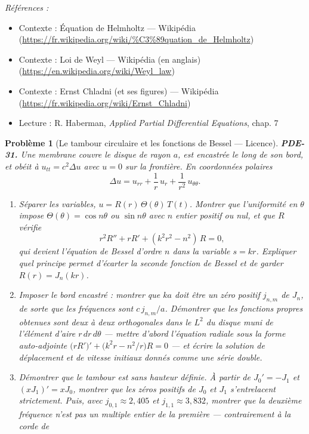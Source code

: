 \documentclass[11pt]{article}
\newtheorem{problem}{Problème}
\newenvironment{refs}{\par\small\noindent\emph{Références :}\begin{itemize}\setlength\itemsep{0pt}}{\end{itemize}\normalsize}
\begin{document}
\begin{refs}
\item Contexte : Équation de Helmholtz --- Wikipédia (\url{https://fr.wikipedia.org/wiki/%C3%89quation_de_Helmholtz})
\item Contexte : Loi de Weyl --- Wikipédia (en anglais) (\url{https://en.wikipedia.org/wiki/Weyl_law})
\item Contexte : Ernst Chladni (et ses figures) --- Wikipédia (\url{https://fr.wikipedia.org/wiki/Ernst_Chladni})
\item Lecture : R. Haberman, \textit{Applied Partial Differential Equations}, chap. 7
\end{refs}

\bigskip

\begin{problem}[{Le tambour circulaire et les fonctions de Bessel --- Licence}]
\textbf{PDE-31.} Une membrane couvre le disque de rayon $a$, est encastrée le long de son
bord, et obéit à $u_{tt} = c^2 \Delta u$ avec $u = 0$ sur la frontière. En coordonnées
polaires
\[ \Delta u = u_{rr} + \frac{1}{r}\,u_r + \frac{1}{r^2}\,u_{\theta\theta}. \]
\begin{enumerate}
\item[(a)] Séparer les variables, $u = R(r)\,\Theta(\theta)\,T(t)$. Montrer que l'uniformité en
$\theta$ impose $\Theta(\theta) = \cos n\theta$ ou $\sin n\theta$ avec $n$ entier
positif ou nul, et que $R$ vérifie
\[ r^2 R'' + r R' + (k^2 r^2 - n^2)\,R = 0, \]
qui devient l'équation de Bessel d'ordre $n$ dans la variable $s = kr$. Expliquer quel
principe permet d'écarter la seconde fonction de Bessel et de garder $R(r) = J_n(kr)$.
\item[(b)] Imposer le bord encastré : montrer que $k a$ doit être un zéro positif $j_{n,m}$ de
$J_n$, de sorte que les fréquences sont $c\,j_{n,m}/a$. Démontrer que les fonctions propres
obtenues sont deux à deux orthogonales dans le $L^2$ du disque muni de l'élément d'aire
$r\,dr\,d\theta$ --- mettre d'abord l'équation radiale sous la forme auto-adjointe
$\bigl(r R'\bigr)' + \bigl(k^2 r - n^2/r\bigr) R = 0$ --- et écrire la solution de déplacement et
de vitesse initiaux donnés comme une série double.
\item[(c)] Démontrer que le tambour est sans hauteur définie. À partir de $J_0' = -J_1$ et
$(x J_1)' = x J_0$, montrer que les zéros positifs de $J_0$ et $J_1$ s'entrelacent
strictement. Puis, avec $j_{0,1} \approx 2{,}405$ et $j_{1,1} \approx 3{,}832$, montrer que la
deuxième fréquence n'est pas un multiple entier de la première --- contrairement à la corde de

\end{enumerate}
\end{problem}
\end{document}
